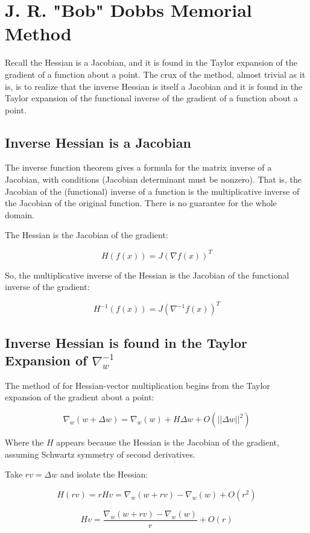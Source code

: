\documentclass{article}
\begin{document}
\section{J. R. "Bob" Dobbs Memorial Method}

Recall the Hessian is a Jacobian, and it is found in the Taylor expansion of the gradient of a function about a point. The crux of the method, almost trivial as it is, is to realize that the inverse Hessian is itself a Jacobian and it is found in the Taylor expansion of the functional inverse of the gradient of a function about a point.

\subsection{Inverse Hessian is a Jacobian}

The inverse function theorem \cite{lang1995} gives a formula for the matrix inverse of a Jacobian, with conditions (Jacobian determinant must be nonzero). That is, the Jacobian of the (functional) inverse of a function is the multiplicative inverse of the Jacobian of the original function. There is no guarantee for the whole domain.

The Hessian is the Jacobian of the gradient:

$$H(f(x)) = J(\nabla f(x))^T $$

So, the multiplicative inverse of the Hessian is the Jacobian of the functional inverse of the gradient:

$$H^{-1}(f(x)) = J(\nabla^{-1} f(x))^T $$

\subsection{Inverse Hessian is found in the Taylor Expansion of $\nabla_w^{-1}$}

The method of \cite{pearlmutter1994} for Hessian-vector multiplication begins from the Taylor expansion of the gradient about a point:

$$\nabla_w (w + \Delta w) = \nabla_w (w) + H\Delta w + O(||\Delta w||^2)$$

Where the $H$ appears because the Hessian is the Jacobian of the gradient, assuming Schwartz symmetry of second derivatives.

Take $rv = \Delta w$ and isolate the Hessian:

$$H(rv) = rHv = \nabla_w(w + rv) - \nabla_w(w) + O(r^2)$$

$$Hv = \frac{\nabla_w(w + rv) - \nabla_w(w)}{r} + O(r)$$
\end{document}
